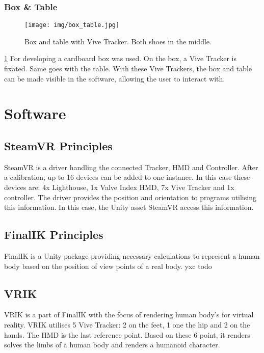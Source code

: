 \subsubsection{Box \& Table}
\begin{figure}
	\centering
	\texttt{[image: img/box\_table.jpg]}
	\caption{Box and table with Vive Tracker. Both shoes in the middle.}
	\label{fig:box_table}
\end{figure}
\ref{fig:box_table}
For developing a cardboard box was used. On the box, a Vive Tracker is fixated. Same goes with the table. With these Vive Trackers, the box and table can be made visible in the software, allowing the user to interact with. %

\section{Software}
\subsection{SteamVR Principles}
SteamVR is a driver handling the connected Tracker, HMD and Controller. After a calibration, up to 16 devices can be added to one instance. In this case these devices are: 4x Lighthouse, 1x Valve Index HMD, 7x Vive Tracker and 1x controller. The driver provides the position and orientation to programs utilising this information. In this case, the Unity asset SteamVR access this information.
\subsection{FinalIK Principles}
FinalIK is a Unity package providing necessary calculations to represent a human body based on the position of view points of a real body. yxc todo
\subsection{VRIK}
VRIK is a part of FinalIK with the focus of rendering human body's for virtual reality. VRIK utilises 5 Vive Tracker: 2 on the feet, 1 one the hip and 2 on the hands. The HMD is the last reference point. Based on these 6 point, it renders solves the limbs of a human body and renders a humanoid character. %
